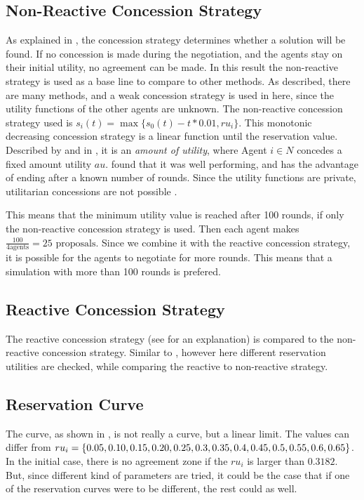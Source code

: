 \subsection{Non-Reactive Concession Strategy}
As explained in , the concession strategy determines whether a solution will be found. If no concession is made during the negotiation, and the agents stay on their initial utility, no agreement can be made. In this result the non-reactive strategy is used as a base line to compare to other methods. As described, there are many methods, and a weak concession strategy is used in here, since the utility functions of the other agents are unknown. The non-reactive concession strategy used is $s_i(t) = \max \{s_0(t) - t * 0.01, ru_i\}$. This monotonic decreasing concession strategy is a linear function until the reservation value. Described by \citet{wu2009efficient} and in , it is an \textit{amount of utility}, where Agent $ i \in N$ concedes a fixed amount utility $au$. \citet{wu2009efficient} found that it was well performing, and has the advantage of ending after a known number of rounds. Since the utility functions are private, utilitarian concessions are not possible \citep{endriss2006monotonic}. 

This means that the minimum utility value is reached after 100 rounds, if only the non-reactive concession strategy is used. Then each agent makes $\frac{100}{4 \text{agents}} = 25 \text{ proposals}$. Since we combine it with the reactive concession strategy, it is possible for the agents to negotiate for more rounds. This means that a simulation with more than 100 rounds is prefered.

\subsection{Reactive Concession Strategy}
The reactive concession strategy (see  for an explanation) is compared to the non-reactive concession strategy. Similar to \citet{zheng2015automated}, however here different reservation utilities are checked, while comparing the reactive to non-reactive strategy.

\subsection{Reservation Curve}
The curve, as shown in , is not really a curve, but a linear limit. The values can differ from 	
$ru_i = \{0.05, 0.10, 0.15, 0.20, 0.25, 0.3, 0.35, 0.4, 0.45, 0.5, \\0.55, 0.6, 0.65\}$. In the initial case, there is no agreement zone if the $ru_i$ is larger than $0.3182$. But, since different kind of parameters are tried, it could be the case that if one of the reservation curves were to be different, the rest could as well. 

